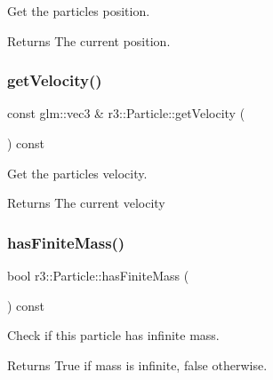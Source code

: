 Get the particle\textquotesingle{}s position. 

\begin{DoxyReturn}{Returns}
The current position. 
\end{DoxyReturn}
\mbox{\label{classr3_1_1_particle_ad62513767465d21c328b4296aa9720ff}} 
\subsubsection{\texorpdfstring{get\+Velocity()}{getVelocity()}}
{\footnotesize\ttfamily const glm\+::vec3 \& r3\+::\+Particle\+::get\+Velocity (\begin{DoxyParamCaption}{ }\end{DoxyParamCaption}) const}



Get the particle\textquotesingle{}s velocity. 

\begin{DoxyReturn}{Returns}
The current velocity 
\end{DoxyReturn}
\mbox{\label{classr3_1_1_particle_a7517367ac5587d97d783429585ec0e90}} 
\subsubsection{\texorpdfstring{has\+Finite\+Mass()}{hasFiniteMass()}}
{\footnotesize\ttfamily bool r3\+::\+Particle\+::has\+Finite\+Mass (\begin{DoxyParamCaption}{ }\end{DoxyParamCaption}) const}



Check if this particle has infinite mass. 

\begin{DoxyReturn}{Returns}
True if mass is infinite, false otherwise. 
\end{DoxyReturn}
\mbox{\label{classr3_1_1_particle_a660673cfa03f0195560df72c659b22a5}} 
